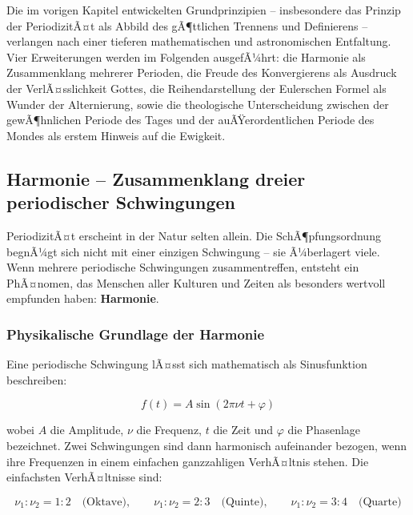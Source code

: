 ﻿\documentclass[a4paper,12pt]{article}
\theoremstyle{definition}
\begin{document}
Die im vorigen Kapitel entwickelten Grundprinzipien -- insbesondere das Prinzip
der PeriodizitÃ¤t als Abbild des gÃ¶ttlichen Trennens und Definierens -- verlangen
nach einer tieferen mathematischen und astronomischen Entfaltung. Vier Erweiterungen
werden im Folgenden ausgefÃ¼hrt: die Harmonie als Zusammenklang mehrerer Perioden,
die Freude des Konvergierens als Ausdruck der VerlÃ¤sslichkeit Gottes, die
Reihendarstellung der Eulerschen Formel als Wunder der Alternierung, sowie die
theologische Unterscheidung zwischen der gewÃ¶hnlichen Periode des Tages und der
auÃŸerordentlichen Periode des Mondes als erstem Hinweis auf die Ewigkeit.

\subsection{Harmonie -- Zusammenklang dreier periodischer Schwingungen}

PeriodizitÃ¤t erscheint in der Natur selten allein. Die SchÃ¶pfungsordnung begnÃ¼gt
sich nicht mit einer einzigen Schwingung -- sie Ã¼berlagert viele. Wenn mehrere
periodische Schwingungen zusammentreffen, entsteht ein PhÃ¤nomen, das Menschen
aller Kulturen und Zeiten als besonders wertvoll empfunden haben: \textbf{Harmonie}.

\subsubsection{Physikalische Grundlage der Harmonie}

Eine periodische Schwingung lÃ¤sst sich mathematisch als Sinusfunktion beschreiben:

\begin{equation}
	f(t) = A \sin(2\pi \nu t + \varphi)
\end{equation}

wobei $A$ die Amplitude, $\nu$ die Frequenz, $t$ die Zeit und $\varphi$ die
Phasenlage bezeichnet. Zwei Schwingungen sind dann harmonisch aufeinander bezogen,
wenn ihre Frequenzen in einem einfachen ganzzahligen VerhÃ¤ltnis stehen. Die
einfachsten VerhÃ¤ltnisse sind:

\begin{equation}
	\nu_1 : \nu_2 = 1 : 2 \quad \text{(Oktave)}, \qquad
	\nu_1 : \nu_2 = 2 : 3 \quad \text{(Quinte)}, \qquad
	\nu_1 : \nu_2 = 3 : 4 \quad \text{(Quarte)}
\end{equation}
\end{document}
